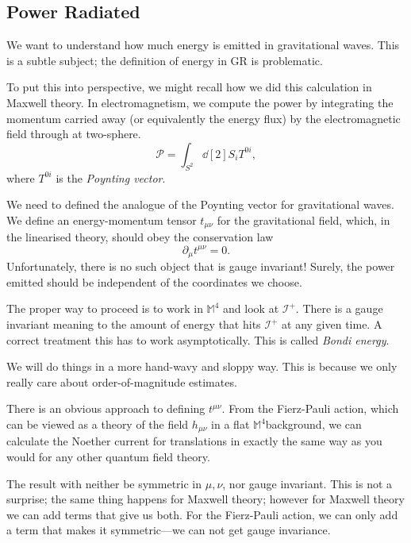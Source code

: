 
\subsection{Power Radiated}%
\label{sub:power_radiated}

We want to understand how much energy is emitted in gravitational waves.
This is a subtle subject; the definition of energy in GR is problematic.

To put this into perspective, we might recall how we did this calculation in Maxwell theory.
In electromagnetism, we compute the power by integrating the momentum carried away (or equivalently the energy flux) by the electromagnetic field through at two-sphere.
\begin{equation}
  \mathcal{P} = \int_{S^2} \dd[2]{S_i} T^{0i},
\end{equation}
where $T^{0i}$ is the \emph{Poynting vector}.

We need to defined the analogue of the Poynting vector for gravitational waves.
We define an energy-momentum tensor $t_{\mu\nu}$ for the gravitational field, which, in the linearised theory, should obey the conservation law
\begin{equation}
  \partial_{\mu} t^{\mu\nu} = 0.
\end{equation}
Unfortunately, there is no such object that is gauge invariant!
Surely, the power emitted should be independent of the coordinates we choose.

The proper way to proceed is to work in $\mathbb{M}^4$ and look at $\mathscr{I}^+$. There is a gauge invariant meaning to the amount of energy that hits $\mathscr{I}^+$ at any given time.
A correct treatment this has to work asymptotically. This is called \emph{Bondi energy}.

We will do things in a more hand-wavy and sloppy way.
This is because we only really care about order-of-magnitude estimates.

There is an obvious approach to defining $t^{\mu\nu}$. From the Fierz-Pauli action, which can be viewed as a theory of the field $h_{\mu\nu}$ in a flat $\mathbb{M}^4$background, we can calculate the Noether current for translations in exactly the same way as you would for any other quantum field theory.

The result with neither be symmetric in $\mu, \nu$, nor gauge invariant.
This is not a surprise; the same thing happens for Maxwell theory; however for Maxwell theory we can add terms that give us both. For the Fierz-Pauli action, we can only add a term that makes it symmetric---we can not get gauge invariance.

